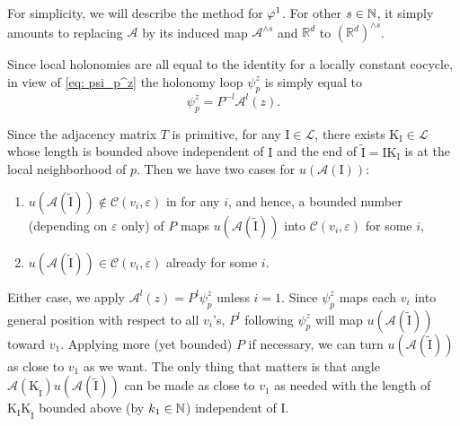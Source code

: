 \documentclass[11pt,oneside,reqno]{amsart}
\numberwithin{equation}{section}
\numberwithin{figure}{section}
\theoremstyle{definition}
\theoremstyle{definition}
\theoremstyle{definition}
\theoremstyle{definition}
\theoremstyle{remark}
\theoremstyle{definition}
\theoremstyle{definition}
\theoremstyle{definition}
\def\A{\mathcal{A}}
\def\L{\mathcal{L}}
\def\R{\mathbb{R}}
\def\CC{\mathcal{C}}
\def\I{\mathrm{I}}
\def\K{\mathrm{K}}
\def\ep{\varepsilon}
\begin{document}
For simplicity, we will describe the method for $\varphi^1$. For other $s \in \mathbb{N}$, it simply amounts to replacing $\A$ by its induced map $\A^{\wedge s}$ and $\R^d$ to $(\R^d)^{\wedge s}$. 

Since local holonomies are all equal to the identity for a locally constant cocycle, in view of \eqref{eq: psi_p^z} the holonomy loop $\psi_p^z$ is simply equal to $$\psi_p^z = P^{-l}\A^l(z).$$


Since the adjacency matrix $T$ is primitive, for any $\I\in \L$, there exists $\K_{\I} \in \L$ whose length is bounded above independent of $\I$ and the end of $\tilde{\I} = \I\K_{\I}$ is at the local neighborhood of $p$. Then we have two cases for $u(\A(\I))$:
\begin{enumerate}
\item  $u(\A(\tilde{\I})) \not\in \CC(v_i ,\ep)$ in for any $i$, and hence, a bounded number (depending on $\ep$ only) of $P$ maps $u(\A(\tilde{\I}))$ into  $\CC(v_i,\ep)$ for some $i$,
\item $u(\A(\tilde{\I})) \in \CC(v_i ,\ep)$ already for some $i$.
\end{enumerate}
Either case, we apply $\A^l(z) = P^l\psi_p^z$ unless $i = 1$. Since $\psi_p^z$ maps each $v_i$ into general position with respect to all $v_i$'s, $P^l$ following $\psi_p^z$ will map $u(\A(\tilde{\I}))$ toward $v_1$. Applying more (yet bounded) $P$ if necessary, we can turn $u(\A(\tilde{\I}))$ as close to $v_1$ as we want. The only thing that matters is that angle $\A(\K_{\tilde{\I}})u(\A(\tilde{\I}))$ can be made as close to $v_1$ as needed with the length of $\K_\I\K_{\tilde{\I}}$ bounded above (by $k_1 \in \mathbb{N}$) independent of $\I$.
\end{document}
